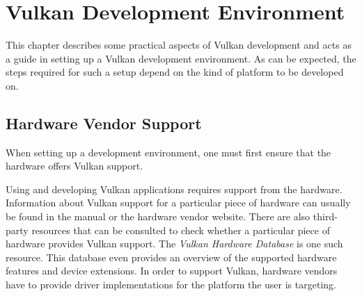 
\chapter{Vulkan Development Environment}
\label{cha:EnvSetup}



  This chapter describes some practical aspects of Vulkan development and acts as a guide in setting up a Vulkan development environment. As can be expected, the steps required for such a setup depend on the kind of platform to be developed on.


  \section{Hardware Vendor Support}
  \label{sec:HardwareVendorSupport}
    When setting up a development environment, one must first ensure that the hardware offers Vulkan support.

    Using and developing Vulkan applications requires support from the hardware. Information about Vulkan support for a particular piece of hardware can usually be found in the manual or the hardware vendor website. There are also third-party resources that can be consulted to check whether a particular piece of hardware provides Vulkan support. The \textit{Vulkan Hardware Database}\cite{vulkangpuinfo} is one such resource. This database even provides an overview of the supported hardware features and device extensions. In order to support Vulkan, hardware vendors have to provide driver implementations for the platform the user is targeting.


